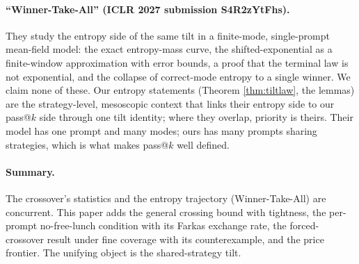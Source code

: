 \paragraph{``Winner-Take-All'' (ICLR 2027 submission S4R2zYtFhs).}
They study the entropy side of the same tilt in a finite-mode, single-prompt
mean-field model: the exact entropy-mass curve, the shifted-exponential as a
finite-window approximation with error bounds, a proof that the terminal law is
not exponential, and the collapse of correct-mode entropy to a single winner. We
claim none of these. Our entropy statements (Theorem \ref{thm:tiltlaw}, the
lemmas) are the strategy-level, mesoscopic context that links their entropy side
to our pass@$k$ side through one tilt identity; where they overlap, priority is
theirs. Their model has one prompt and many modes; ours has many prompts sharing
strategies, which is what makes pass@$k$ well defined.

\paragraph{Summary.}
The crossover's statistics \citep{yangchen2026kernel} and the entropy trajectory
(Winner-Take-All) are concurrent. This paper adds the general crossing bound with
tightness, the per-prompt no-free-lunch condition with its Farkas exchange rate,
the forced-crossover result under fine coverage with its counterexample, and the
price frontier. The unifying object is the shared-strategy tilt.